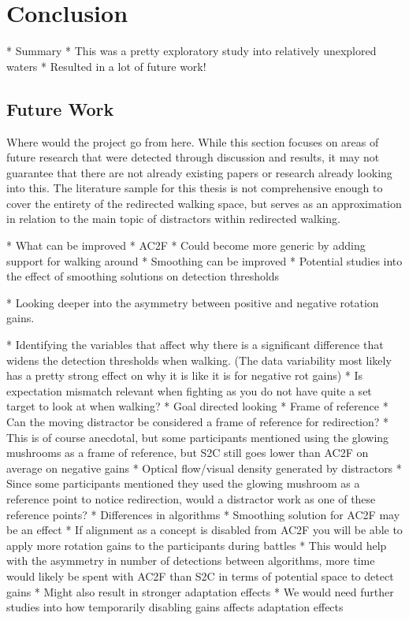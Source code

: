 \chapter{Conclusion}\label{chap:conclusion}
* Summary
* This was a pretty exploratory study into relatively unexplored waters
   * Resulted in a lot of future work!


\section{Future Work}\label{sec:futurework}
Where would the project go from here. While this section focuses on areas of future research that were detected through discussion and results, it may not guarantee that there are not already existing papers or research already looking into this. The literature sample for this thesis is not comprehensive enough to cover the entirety of the redirected walking space, but serves as an approximation in relation to the main topic of distractors within redirected walking. 

* What can be improved
* AC2F
   * Could become more generic by adding support for walking around
   * Smoothing can be improved
   * Potential studies into the effect of smoothing solutions on detection thresholds

* Looking deeper into the asymmetry between positive and negative rotation gains. 

* Identifying the variables that affect why there is a significant difference that widens the detection thresholds when walking. (The data variability most likely has a pretty strong effect on why it is like it is for negative rot gains)
   * Is expectation mismatch relevant when fighting as you do not have quite a set target to look at when walking?
      * Goal directed looking
   * Frame of reference
      * Can the moving distractor be considered a frame of reference for redirection?
      * This is of course anecdotal, but some participants mentioned using the glowing mushrooms as a frame of reference, but S2C still goes lower than AC2F on average on negative gains
      * Optical flow/visual density generated by distractors
         * Since some participants mentioned they used the glowing mushroom as a reference point to notice redirection, would a distractor work as one of these reference points?
   * Differences in algorithms
      * Smoothing solution for AC2F may be an effect
      * If alignment as a concept is disabled from AC2F you will be able to apply more rotation gains to the participants during battles
         * This would help with the asymmetry in number of detections between algorithms, more time would likely be spent with AC2F than S2C in terms of potential space to detect gains
         * Might also result in stronger adaptation effects
            * We would need further studies into how temporarily disabling gains affects adaptation effects

